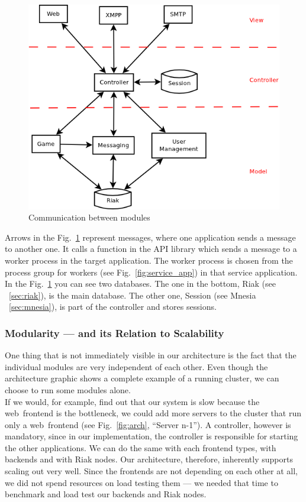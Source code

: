 \documentclass[11pt,a4paper]{report}
\begin{document}
\begin{figure}[h]
 \centering
 \includegraphics[width=12cm]{./graphics/Modules_Communication.png}
 \caption{Communication between modules}
 \label{fig:mod_conn}
\end{figure}

Arrows in the Fig.~\ref{fig:mod_conn} represent messages, where one application
sends a message to another one. It calls a function in the API library
which sends a message to a worker process in the target application. The worker
process is chosen from the process group for workers
(see Fig.~\ref{fig:service_app}) in that service application. In the
Fig.~\ref{fig:mod_conn} you can see two databases. The one in the bottom, Riak
(see ~\ref{sec:riak}), is the main database. The other one, Session
(see Mnesia ~\ref{sec:mnesia}), is part of the controller and stores sessions.

\subsubsection{Modularity --- and its Relation to Scalability}
One thing that is not immediately visible in our architecture is the fact that
the individual modules are very independent of each other. Even though the
architecture graphic shows a complete example of a running cluster, we can
choose to run some modules alone. \\
If we would, for example, find out that our system is slow because the
web~frontend is the bottleneck, we could add more servers to the cluster that
run only a web~frontend (see Fig.~\ref{fig:arch}, ``Server n-1'').
A controller, however is mandatory, since in our implementation, the controller
is responsible for starting the other applications.
We can do the same with each frontend types, with backends and with Riak nodes.
Our architecture, therefore, inherently supports scaling out very well.
Since the frontends are not depending on each other at all, we did not spend
resources on load testing them --- we needed that
time to benchmark and load test our backends and Riak nodes.
\end{document}

